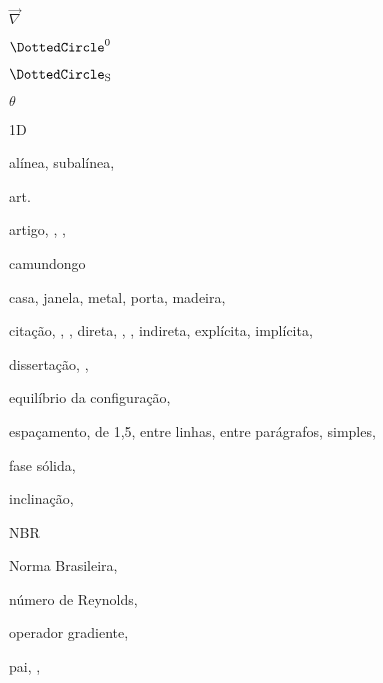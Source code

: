 \begin{RemissiveIndex}
\item \ensuremath{\vec{\nabla}} 
\item \ensuremath{\DottedCircle^0} 
\item \ensuremath{\DottedCircle_\mathrm{S}} 
\item \ensuremath{\theta} 
\item 1D 
\indexspace%
\item alínea, 
\subitem subalínea, 
\item art.\ 
\item artigo, , , 
\indexspace%
\item camundongo 
\item casa, 
\subitem janela, 
\subsubitem metal, 
\subitem porta, 
\subsubitem madeira, 
\item citação, , , 
\subitem direta, , , 
\subitem indireta, 
\subsubitem explícita, 
\subsubitem implícita, 
\indexspace%
\item dissertação, , 
\indexspace%
\item equilíbrio da configuração, 
\item espaçamento, 
\subitem de 1,5, 
\subitem entre linhas, 
\subitem entre parágrafos, 
\subitem simples, 
\indexspace%
\item fase sólida, 
\indexspace%
\item inclinação, 
\indexspace%
\item NBR 
\item Norma Brasileira, 
\item número de Reynolds, 
\indexspace%
\item operador gradiente, 
\indexspace%
\item pai, , 

\end{RemissiveIndex}
